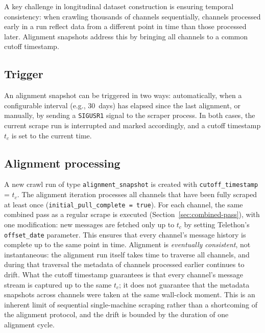 A key challenge in longitudinal dataset construction is ensuring temporal consistency: when crawling thousands of channels sequentially, channels processed early in a run reflect data from a different point in time than those processed later.
Alignment snapshots address this by bringing all channels to a common cutoff timestamp.

\subsection{Trigger}

An alignment snapshot can be triggered in two ways: automatically, when a configurable interval (e.g., 30~days) has elapsed since the last alignment, or manually, by sending a \texttt{SIGUSR1} signal to the scraper process.
In both cases, the current scrape run is interrupted and marked accordingly, and a cutoff timestamp $t_c$ is set to the current time.

\subsection{Alignment processing}

A new crawl run of type \texttt{alignment\_snapshot} is created with \texttt{cutoff\_timestamp} = $t_c$.
The alignment iteration processes all channels that have been fully scraped at least once (\texttt{initial\_pull\_complete = true}).
For each channel, the same combined pass as a regular scrape is executed (Section~\ref{sec:combined-pass}), with one modification: new messages are fetched only up to $t_c$ by setting Telethon's \texttt{offset\_date} parameter.
This ensures that every channel's message history is complete up to the same point in time.
Alignment is \emph{eventually consistent}, not instantaneous: the alignment run itself takes time to traverse all channels, and during that traversal the metadata of channels processed earlier continues to drift. What the cutoff timestamp guarantees is that every channel's message stream is captured up to the same $t_c$; it does not guarantee that the metadata snapshots across channels were taken at the same wall-clock moment. This is an inherent limit of sequential single-machine scraping rather than a shortcoming of the alignment protocol, and the drift is bounded by the duration of one alignment cycle.

